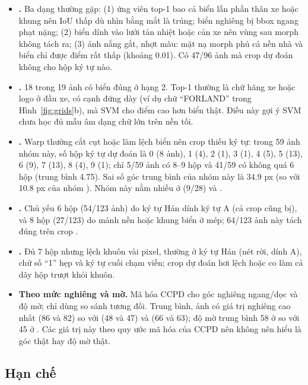 \begin{itemize}
  \item \textbf{.} Ba dạng thường gặp: (1) ứng viên top-1 bao cả biển lẫn phần thân xe hoặc khung nên IoU thấp dù nhìn bằng mắt là trúng; biển nghiêng bị bbox ngang phạt nặng; (2) biển dính vào lưới tản nhiệt hoặc cản xe nên vùng sau morph không tách ra; (3) ảnh  nắng gắt, nhợt màu: mặt nạ morph phủ cả nền nhà và biển chỉ được điểm rất thấp (khoảng 0.01). Có 47/96 ảnh mà crop dự đoán không cho hộp ký tự nào.
  \item \textbf{.} 18 trong 19 ảnh có biển đúng ở hạng 2. Top-1 thường là chữ hãng xe hoặc logo ở đầu xe, có cạnh đứng dày (ví dụ chữ ``FORLAND'' trong Hình~\ref{fig:grids}b), mà SVM cho điểm cao hơn biển thật. Điều này gợi ý SVM chưa học đủ mẫu âm dạng chữ lớn trên nền tối.
  \item \textbf{.} Warp thường cắt cụt hoặc làm lệch biển nên crop thiếu ký tự: trong 59 ảnh nhóm này, số hộp ký tự dự đoán là 0 (8 ảnh), 1 (4), 2 (1), 3 (1), 4 (5), 5 (13), 6 (9), 7 (13), 8 (4), 9 (1); chỉ 5/59 ảnh có 8--9 hộp và 41/59 có không quá 6 hộp (trung bình 4.75). Sai số góc trung bình của nhóm này là 34.9 px (so với 10.8 px của nhóm ). Nhóm này nằm nhiều ở  (9/28) và .
  \item \textbf{.} Chủ yếu 6 hộp (54/123 ảnh) do ký tự Hán dính ký tự A (cả crop  cũng bị), và 8 hộp (27/123) do mảnh nền hoặc khung biển ở mép; 64/123 ảnh này tách đúng trên crop .
  \item \textbf{.} Đủ 7 hộp nhưng lệch khuôn vài pixel, thường ở ký tự Hán (nét rời, dính A), chữ số ``1'' hẹp và ký tự cuối chạm viền; crop dự đoán hơi lệch hoặc co làm cả dãy hộp trượt khỏi khuôn.
  \item {\sloppy \textbf{Theo mức nghiêng và mờ.} Mã hóa CCPD cho góc nghiêng ngang/dọc và độ mờ; chỉ dùng so sánh tương đối. Trung bình, ảnh  có giá trị nghiêng cao nhất (86 và 82) so với  (48 và 47) và  (66 và 63); độ mờ trung bình 58 ở  so với 45 ở . Các giá trị này theo quy ước mã hóa của CCPD nên không nên hiểu là góc thật hay độ mờ thật.\par}
\end{itemize}

\subsection{Hạn chế}
\label{sec:limits}

